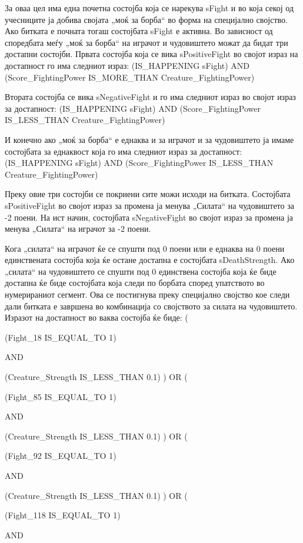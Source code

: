 За оваа цел има една почетна состојба која се нарекува sFight и во која секој од учесниците ја добива својата „моќ за борба“ во форма на специјално својство. Ако битката е почната тогаш состојбата sFight е активна. Во зависност од споредбата меѓу „моќ за борба“ на играчот и чудовиштето можат да бидат три достапни состојби. Првата состојба која се вика sPositiveFight во својот израз на достапност го има следниот израз: (IS\_HAPPENING sFight) AND (Score\_FightingPower IS\_MORE\_THAN Creature\_FightingPower)

Втората состојба се вика sNegativeFight и го има следниот израз во својот израз за достапност: (IS\_HAPPENING sFight) AND (Score\_FightingPower IS\_LESS\_THAN Creature\_FightingPower)

И конечно ако „моќ за борба“ е еднаква и за играчот и за чудовиштето ја имаме состојбата за еднаквост која го има следниот израз за достапност: (IS\_HAPPENING sFight) AND (Score\_FightingPower IS\_LESS\_THAN Creature\_FightingPower)

Преку овие три состојби се покриени сите можи исходи на битката. Состојбата sPositiveFight во својот израз за промена ја менува „Силата“ на чудовиштето за -2 поени. На ист начин, состојбата sNegativeFight во својот израз за промена ја менува „Силата“ на играчот за -2 поени.

Кога „силата“ на играчот ќе се спушти под 0 поени или е еднаква на 0 поени единствената состојба која ќе остане достапна е состојбата sDeathStrength. Ако „силата“ на чудовиштето се спушти под 0 единствена состојба која ќе биде достапна ќе биде состојбата која следи по борбата според упатството во нумерираниот сегмент. Ова се постигнува преку специјално својство кое следи дали битката е завршена во комбинација со својството за силата на чудовиштето. Изразот на достапност во ваква состојба ќе биде: (

(Fight\_18 IS\_EQUAL\_TO 1)

AND

(Creature\_Strength IS\_LESS\_THAN 0.1) ) OR (

(Fight\_85 IS\_EQUAL\_TO 1)

AND

(Creature\_Strength IS\_LESS\_THAN 0.1) ) OR (

(Fight\_92 IS\_EQUAL\_TO 1)

AND

(Creature\_Strength IS\_LESS\_THAN 0.1) ) OR (

(Fight\_118 IS\_EQUAL\_TO 1)

AND

